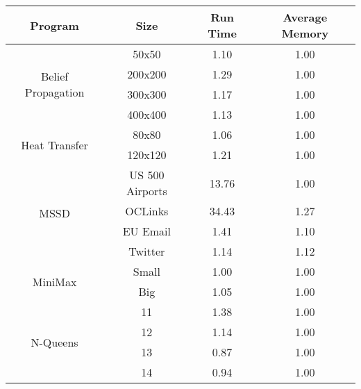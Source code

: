 \begin{tabular}{c | c || c | c} \hline
	\textbf{Program} & \textbf{Size} & \textbf{Run Time} & \textbf{Average Memory}\\ \hline \hline
	\multirow{4}{*}{Belief Propagation}  & 50x50 &  1.10  &  1.00
  \\
		 & 200x200 &  1.29  &  1.00
  \\
		 & 300x300 &  1.17  &  1.00
  \\
		 & 400x400 &  1.13  &  1.00
  \\
	\hline
	\multirow{2}{*}{Heat Transfer}  & 80x80 &  1.06  &  1.00
  \\
		 & 120x120 &  1.21  &  1.00
  \\
	\hline
	\multirow{4}{*}{MSSD}  & US 500 Airports &  13.76  &  1.00
  \\
		 & OCLinks &  34.43  &  1.27
  \\
		 & EU Email &  1.41  &  1.10
  \\
		 & Twitter &  1.14  &  1.12
  \\
	\hline
	\multirow{2}{*}{MiniMax}  & Small &  1.00  &  1.00
  \\
		 & Big &  1.05  &  1.00
  \\
	\hline
	\multirow{4}{*}{N-Queens}  & 11 &  1.38  &  1.00
  \\
		 & 12 &  1.14  &  1.00
  \\
		 & 13 &  0.87  &  1.00
  \\
		 & 14 &  0.94  &  1.00
  \\
	\hline
\end{tabular}
